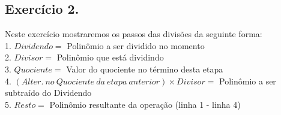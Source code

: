 \documentclass[12pt]{article}
\begin{document}
\subsection*{Exercício 2.}
	\begin{center}
	Neste exercício mostraremos os passos das divisões da seguinte forma:\\
			1. $Dividendo =$ Polinômio a ser dividido no momento\\
			2. $Divisor =$ Polinômio que está dividindo\\
			3. $Quociente =$ Valor do quociente no término desta etapa\\
			4. $(Alter. \ no \ Quociente \ da \ etapa \ anterior) \times Divisor =$ Polinômio a ser subtraído do Dividendo\\
			5. $Resto =$ Polinômio resultante da operação (linha 1 - linha 4)\\
	\end{center}		
\end{document}
